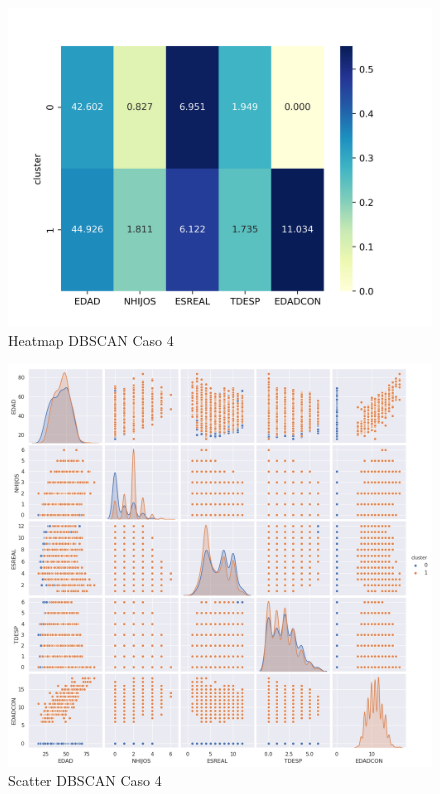 \begin{figure}[H] %
	\centering
	\includegraphics[scale=0.65]{heatmap-dbscan4.png}  %
	\caption{Heatmap DBSCAN Caso 4} 
	\label{fig:hm-db-caso4}
\end{figure}

\begin{figure}[H] %
	\centering
	\includegraphics[scale=0.37]{dbscan4.png}  %
	\caption{Scatter DBSCAN Caso 4} 
	\label{fig:sc-db-caso4}
\end{figure}

